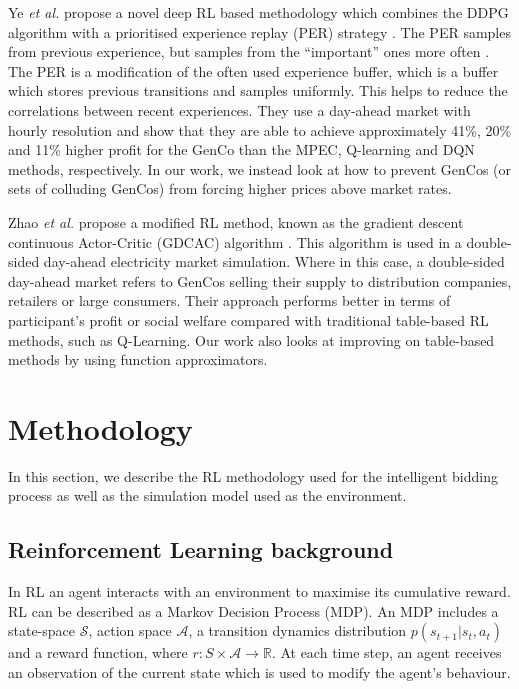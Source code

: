 Ye \textit{et al.} propose a novel deep RL based methodology which combines the DDPG algorithm with a prioritised experience replay (PER) strategy \cite{Ye2020a}. The PER samples from previous experience, but samples from the ``important'' ones more often \cite{Schaul2016}. The PER is a modification of the often used experience buffer, which is a buffer which stores previous transitions and samples uniformly. This helps to reduce the correlations between recent experiences. They use a day-ahead market with hourly resolution and show that they are able to achieve approximately 41\%, 20\% and 11\% higher profit for the GenCo than the MPEC, Q-learning and DQN methods, respectively. In our work, we instead look at how to prevent GenCos (or sets of colluding GenCos) from forcing higher prices above market rates.



Zhao \textit{et al.} propose a modified RL method, known as the gradient descent continuous Actor-Critic (GDCAC) algorithm \cite{Zhao2016}. This algorithm is used in a double-sided day-ahead electricity market simulation. Where in this case, a double-sided day-ahead market refers to GenCos selling their supply to distribution companies, retailers or large consumers. Their approach performs better in terms of participant's profit or social welfare compared with traditional table-based RL methods, such as Q-Learning. Our work also looks at improving on table-based methods by using function approximators.





\section{Methodology}
\label{rl:sec:material}

In this section, we describe the RL methodology used for the intelligent bidding process as well as the simulation model used as the environment.

\subsection{Reinforcement Learning background}


In RL an agent interacts with an environment to maximise its cumulative reward. RL can be described as a Markov Decision Process (MDP). An MDP includes a state-space $\mathcal{S}$, action space $\mathcal{A}$, a transition dynamics distribution $p(s_{t+1}|s_t,a_t)$ and a reward function, where $r:S\times \mathcal{A} \rightarrow \mathbb{R}$. At each time step, an agent receives an observation of the current state which is used to modify the agent's behaviour.

